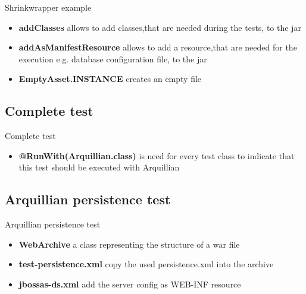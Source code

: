\begin{frame}{Shrinkwrapper example}
  

\begin{itemize}
	\item{\textbf{addClasses} allows to add classes,that are needed during the tests, to the jar}
	\item{\textbf{addAsManifestResource} allows to add a resource,that are needed for the execution e.g. database configuration file, to the jar}
	\item{\textbf{EmptyAsset.INSTANCE} creates an empty file}
\end{itemize}

\end{frame}

\subsection[Complete test]{Complete test}
\begin{frame}{Complete test}
  
\begin{itemize}
	\item{\textbf{@RunWith(Arquillian.class)} is need for every test class to indicate that this test should be executed with Arquillian}
	
\end{itemize}
\end{frame}
\subsection[Persistence test]{Arquillian persistence test}
\begin{frame}{Arquillian persistence test}
  
\begin{itemize}
	\item {\textbf {WebArchive}} a class representing the structure of a war file
	\item {\textbf {test-persistence.xml}} copy the used persistence.xml into the archive
	\item {\textbf {jbossas-ds.xml}} add the server config as WEB-INF resource
\end{itemize}
\end{frame}

